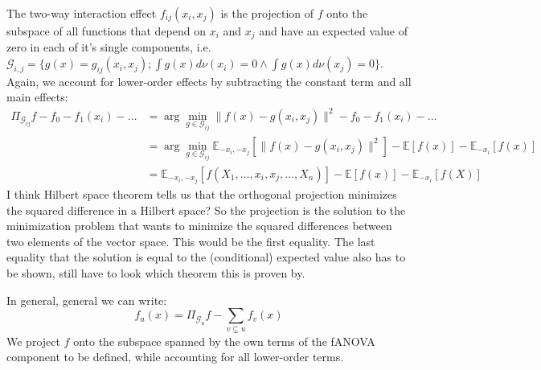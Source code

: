 The two-way interaction effect $f_{ij}(x_i,x_j)$ is the projection of $f$ onto the subspace of all functions that depend on $x_i$ and $x_j$ and have an expected value of zero in each of it's single components, i.e. $\mathcal{G}_{i,j} = \{g(x) = g_{ij}(x_i, x_j); \int g(x) d\nu (x_i) = 0 \land \int g(x) d\nu (x_j) = 0\}$. Again, we account for lower-order effects by subtracting the constant term and all main effects:
\begin{align*}
    \Pi_{\mathcal{G}_{ij}}f - f_0 - f_1(x_i) - \dots
    &= \arg \min_{g \in \mathcal{G}_{ij}} \|f(x) - g(x_i, x_j)\|^2 - f_0 - f_1(x_i) - \dots \\
    &= \arg \min_{g \in \mathcal{G}_{ij}} \mathbb{E}_{-x_i, -x_j}[\|f(x) - g(x_i, x_j)\|^2] - \mathbb{E}[f(x)] - \mathbb{E}_{-x_i}[f(x)]\\
    &= \mathbb{E}_{-x_i, -x_j}[f(X_1, \dots, x_i, x_j, \dots, X_n)] - \mathbb{E}[f(x)] - \mathbb{E}_{-x_i}[f(X)]
\end{align*}
{\color{blue}I think Hilbert space theorem tells us that the orthogonal projection minimizes the squared difference in a Hilbert space?
So the projection is the solution to the minimization problem that wants to minimize the squared differences between two elements of the vector space.
This would be the first equality. The last equality that the solution is equal to the (conditional) expected value also has to be shown, still have to look which theorem this is proven by.}

In general, general we can write:
\begin{equation}
    f_u(x) = \Pi_{\mathcal{G}_u}f - \sum_{v \subsetneq u} f_v(x)
\end{equation}
We project $f$ onto the subspace spanned by the own terms of the fANOVA component to be defined, while accounting for all lower-order terms.




